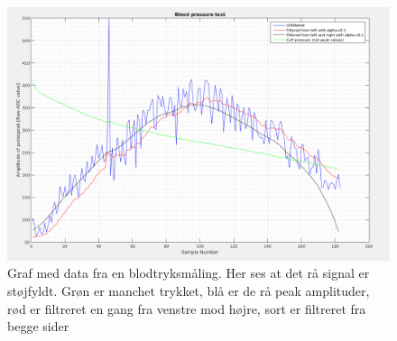 \begin{figure}[H]
	\includegraphics[width=\textwidth]{billeder/4_11_2016_udenMap.png}
	\caption{Graf med data fra en blodtryksmåling. Her ses at det rå signal 	er støjfyldt. Grøn er manchet trykket, blå er de rå peak amplituder, rød er filtreret en gang fra venstre mod højre, sort er filtreret fra begge sider 	}\label{fig:filterWithoutMap}
\end{figure}

